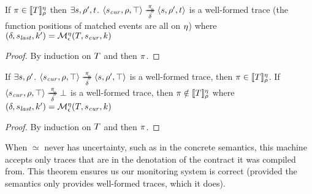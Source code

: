 \begin{theorem}[Soundness]
  If $\pi \in [\![ T ]\!]^{\eta}_{\rho}$ then $\exists s, \rho', t$.
%
  $\langle s_\mathit{cur}, \rho, \top \rangle \overset{\pi}{\underset{\delta}{\to\!\!\!\!\!\to}} \langle s, \rho', t \rangle$ is a well-formed trace (the function positions of matched events are all on $\eta$)
%
  where $(\delta, s_\mathit{last}, k') = {\mathcal M}_\epsilon^\eta(T, s_\mathit{cur}, k)$
\end{theorem}
\begin{proof}
  By induction on $T$ and then $\pi$.
\end{proof}
%
\begin{theorem}
  If $\exists s, \rho'$.
%
  $\langle s_\mathit{cur}, \rho, \top \rangle \overset{\pi}{\underset{\delta}{\to\!\!\!\!\!\to}} \langle s, \rho', \top \rangle$ is a well-formed trace,
  then $\pi \in [\![ T ]\!]^{\eta}_{\rho}$.
  If $\langle s_\mathit{cur}, \rho, \top \rangle \overset{\pi}{\underset{\delta}{\to\!\!\!\!\!\to}} \bot$ is a well-formed trace, then $\pi \notin [\![ T ]\!]^{\eta}_{\rho}$
%
  where $(\delta, s_\mathit{last}, k') = {\mathcal M}_\epsilon^\eta(T, s_\mathit{cur}, k)$
\end{theorem}
\begin{proof}
  By induction on $T$ and then $\pi$.
\end{proof}
%
When $\simeq$ never has uncertainty, such as in the concrete semantics, this machine accepts only traces that are in the denotation of the contract it was compiled from.
%
This theorem ensures us our monitoring system is correct (provided the semantics only provides well-formed traces, which it does).

